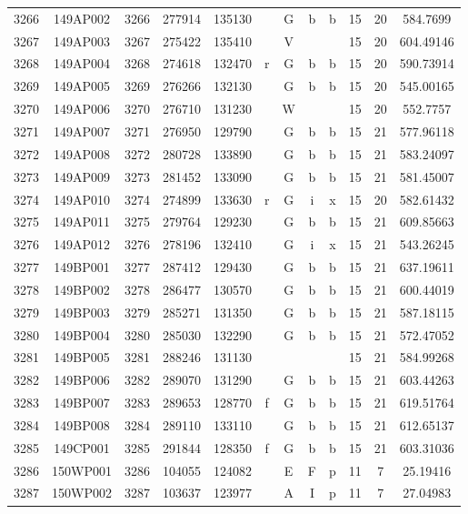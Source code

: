 \begin{tabular}{|*{12}{c|}}
3266 & 149AP002 & 3266 & 277914 & 135130 &  & G & b & b & 15 & 20 & 584.7699 \\ 
3267 & 149AP003 & 3267 & 275422 & 135410 &  & V &  &  & 15 & 20 & 604.49146 \\ 
3268 & 149AP004 & 3268 & 274618 & 132470 & r & G & b & b & 15 & 20 & 590.73914 \\ 
3269 & 149AP005 & 3269 & 276266 & 132130 &  & G & b & b & 15 & 20 & 545.00165 \\ 
3270 & 149AP006 & 3270 & 276710 & 131230 &  & W &  &  & 15 & 20 & 552.7757 \\ 
3271 & 149AP007 & 3271 & 276950 & 129790 &  & G & b & b & 15 & 21 & 577.96118 \\ 
3272 & 149AP008 & 3272 & 280728 & 133890 &  & G & b & b & 15 & 21 & 583.24097 \\ 
3273 & 149AP009 & 3273 & 281452 & 133090 &  & G & b & b & 15 & 21 & 581.45007 \\ 
3274 & 149AP010 & 3274 & 274899 & 133630 & r & G & i & x & 15 & 20 & 582.61432 \\ 
3275 & 149AP011 & 3275 & 279764 & 129230 &  & G & b & b & 15 & 21 & 609.85663 \\ 
3276 & 149AP012 & 3276 & 278196 & 132410 &  & G & i & x & 15 & 21 & 543.26245 \\ 
3277 & 149BP001 & 3277 & 287412 & 129430 &  & G & b & b & 15 & 21 & 637.19611 \\ 
3278 & 149BP002 & 3278 & 286477 & 130570 &  & G & b & b & 15 & 21 & 600.44019 \\ 
3279 & 149BP003 & 3279 & 285271 & 131350 &  & G & b & b & 15 & 21 & 587.18115 \\ 
3280 & 149BP004 & 3280 & 285030 & 132290 &  & G & b & b & 15 & 21 & 572.47052 \\ 
3281 & 149BP005 & 3281 & 288246 & 131130 &  &  &  &  & 15 & 21 & 584.99268 \\ 
3282 & 149BP006 & 3282 & 289070 & 131290 &  & G & b & b & 15 & 21 & 603.44263 \\ 
3283 & 149BP007 & 3283 & 289653 & 128770 & f & G & b & b & 15 & 21 & 619.51764 \\ 
3284 & 149BP008 & 3284 & 289110 & 133110 &  & G & b & b & 15 & 21 & 612.65137 \\ 
3285 & 149CP001 & 3285 & 291844 & 128350 & f & G & b & b & 15 & 21 & 603.31036 \\ 
3286 & 150WP001 & 3286 & 104055 & 124082 &  & E & F & p & 11 & 7 & 25.19416 \\ 
3287 & 150WP002 & 3287 & 103637 & 123977 &  & A & I & p & 11 & 7 & 27.04983 \\ 

\end{tabular}
